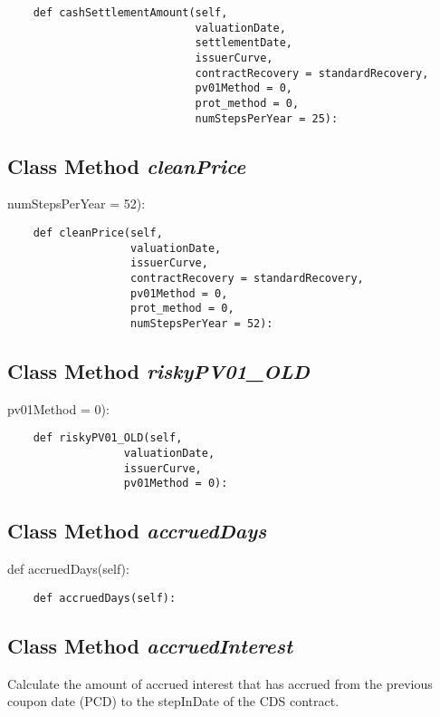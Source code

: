 \documentclass[twoside,11pt]{book}
\begin{document}
\begin{lstlisting}
    def cashSettlementAmount(self,
                             valuationDate,
                             settlementDate,
                             issuerCurve,
                             contractRecovery = standardRecovery,
                             pv01Method = 0,
                             prot_method = 0,
                             numStepsPerYear = 25):
\end{lstlisting}

\subsection{Class Method {\it cleanPrice}}
numStepsPerYear = 52):

\begin{lstlisting}
    def cleanPrice(self,
                   valuationDate,
                   issuerCurve,
                   contractRecovery = standardRecovery,
                   pv01Method = 0,
                   prot_method = 0,
                   numStepsPerYear = 52):
\end{lstlisting}

\subsection{Class Method {\it riskyPV01\_OLD}}
pv01Method = 0):

\begin{lstlisting}
    def riskyPV01_OLD(self,
                  valuationDate,
                  issuerCurve,
                  pv01Method = 0):
\end{lstlisting}

\subsection{Class Method {\it accruedDays}}
def accruedDays(self):

\begin{lstlisting}
    def accruedDays(self):
\end{lstlisting}

\subsection{Class Method {\it accruedInterest}}
Calculate the amount of accrued interest that has accrued from the previous coupon date (PCD) to the stepInDate of the CDS contract. 
\end{document}
